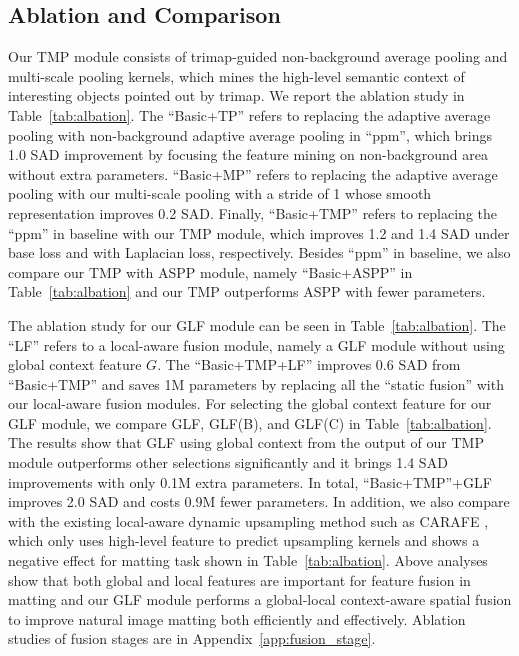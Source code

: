 \documentclass[10pt,twocolumn,letterpaper]{article}
\begin{document}
\subsection{Ablation and Comparison}
Our TMP module consists of trimap-guided non-background average pooling and multi-scale pooling kernels, which mines the high-level semantic context of interesting objects pointed out by trimap. We report the ablation study in Table~\ref{tab:albation}. The ``Basic+TP''  refers to replacing the adaptive average pooling with non-background adaptive average pooling in ``ppm'', which brings 1.0 SAD improvement by focusing the feature mining on non-background area without extra parameters. ``Basic+MP''  refers to replacing the adaptive average pooling with our multi-scale pooling with a stride of 1 whose smooth representation improves 0.2 SAD. Finally, ``Basic+TMP'' refers to replacing the ``ppm'' in baseline with our TMP module, which improves 1.2 and 1.4 SAD under base loss and with Laplacian loss, respectively. Besides ``ppm'' in baseline, we also compare our TMP with ASPP \cite{v3} module, namely ``Basic+ASPP'' in Table~\ref{tab:albation} and our TMP outperforms ASPP with fewer parameters.

The ablation study for our GLF module can be seen in Table~\ref{tab:albation}. The ``LF'' refers to  a local-aware fusion module, namely  a GLF module without using global context feature $G$. The ``Basic+TMP+LF'' improves 0.6 SAD from ``Basic+TMP'' and saves 1M parameters by replacing all the ``static fusion'' with our local-aware fusion modules. For selecting the global context feature for our GLF module, we compare GLF, GLF(B), and GLF(C) in Table~\ref{tab:albation}. The results show that GLF using global context from the output of our TMP module outperforms other selections significantly and it brings 1.4 SAD improvements with only 0.1M extra parameters. In total, ``Basic+TMP''+GLF improves 2.0 SAD and costs 0.9M fewer parameters. In addition, we also compare with the existing local-aware dynamic upsampling method such as CARAFE \cite{carafe}, which only uses high-level feature to predict upsampling kernels and shows a negative effect for matting task shown in Table~\ref{tab:albation}. Above analyses show that both global and local features are important for feature fusion in matting and our GLF module performs a global-local context-aware spatial fusion to improve natural image matting both efficiently  and effectively. Ablation studies of fusion stages are in Appendix~\ref{app:fusion_stage}.
\end{document}

